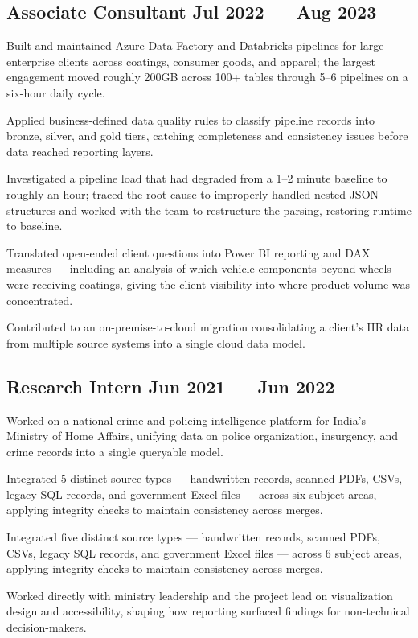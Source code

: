 \subsection{{Associate Consultant \hfill Jul 2022 --- Aug 2023}}
\begin{zitemize}
    \item Built and maintained Azure Data Factory and Databricks pipelines for large enterprise clients across coatings, consumer goods, and apparel; the largest engagement moved roughly 200GB across 100+ tables through 5–6 pipelines on a six-hour daily cycle.
    \item Applied business-defined data quality rules to classify pipeline records into bronze, silver, and gold tiers, catching completeness and consistency issues before data reached reporting layers.
    \item Investigated a pipeline load that had degraded from a 1–2 minute baseline to roughly an hour; traced the root cause to improperly handled nested JSON structures and worked with the team to restructure the parsing, restoring runtime to baseline.
    \item Translated open-ended client questions into Power BI reporting and DAX measures — including an analysis of which vehicle components beyond wheels were receiving coatings, giving the client visibility into where product volume was concentrated.
    \item Contributed to an on-premise-to-cloud migration consolidating a client's HR data from multiple source systems into a single cloud data model.

\end{zitemize}

\subsection{{Research Intern \hfill Jun 2021 --- Jun 2022}}
\begin{zitemize}
    \item Worked on a national crime and policing intelligence platform for India's Ministry of Home Affairs, unifying data on police organization, insurgency, and crime records into a single queryable model.
    \item Integrated 5 distinct source types — handwritten records, scanned PDFs, CSVs, legacy SQL records, and government Excel files — across six subject areas, applying integrity checks to maintain consistency across merges.
    \item Integrated five distinct source types — handwritten records, scanned PDFs, CSVs, legacy SQL records, and government Excel files — across 6 subject areas, applying integrity checks to maintain consistency across merges.
    \item Worked directly with ministry leadership and the project lead on visualization design and accessibility, shaping how reporting surfaced findings for non-technical decision-makers.

\end{zitemize}



